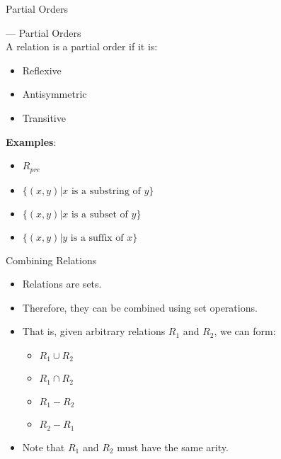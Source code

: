 \documentclass[style=sailor,size=12pt]{powerdot}
\begin{document}
\begin{slide}[bm=,toc=]{Partial Orders}
\begin{defn}{--- Partial Orders}~\\
A relation is a partial order if it is:

\begin{itemize}
\item Reflexive
\item Antisymmetric
\item Transitive
\end{itemize}
\textbf{Examples}:
\begin{itemize}
\item $R_{pre}$
\item $\{(x,y) | x \text{ is a substring of } y \}$
\item $\{(x,y) | x \text{ is a subset of } y \}$
\item $\{(x,y) | y \text{ is a suffix of } x \}$
\end{itemize}
\end{defn}
\end{slide}
\begin{slide}[bm=,toc=]{Combining Relations}
\begin{itemize}
\item Relations are sets.
\item Therefore, they can be combined using set operations.
\item That is, given arbitrary relations $R_1$ and $R_2$, we can form:
\begin{itemize}
\item $R_1 \cup R_2$
\item $R_1 \cap R_2$
\item $R_1 - R_2$
\item $R_2 - R_1$
\end{itemize}
\item Note that $R_1$ and $R_2$ must have the same arity.
\end{itemize}
\end{slide}
\end{document}
